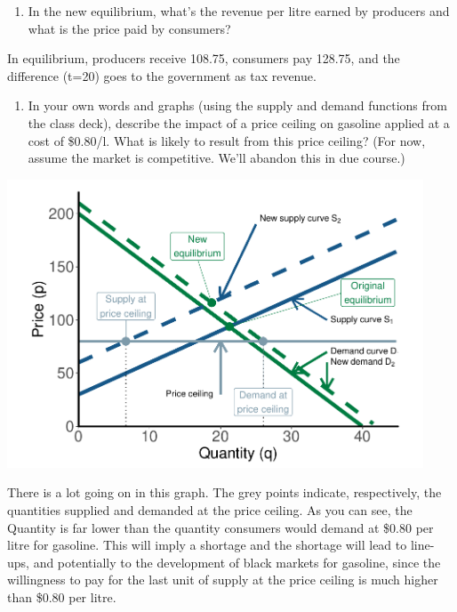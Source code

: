 \documentclass[11pt,]{article}
\providecommand{\tightlist}{%
  \setlength{\itemsep}{0pt}\setlength{\parskip}{0pt}}
\begin{document}
\begin{enumerate}
\def\labelenumi{\alph{enumi})}
\setcounter{enumi}{5}
\tightlist
\item
  In the new equilibrium, what's the revenue per litre earned by
  producers and what is the price paid by consumers?
\end{enumerate}

In equilibrium, producers receive 108.75, consumers pay 128.75, and the
difference (t=20) goes to the government as tax revenue. \newpage

\begin{enumerate}
\def\labelenumi{\arabic{enumi}.}
\setcounter{enumi}{3}
\tightlist
\item
  In your own words and graphs (using the supply and demand functions
  from the class deck), describe the impact of a price ceiling on
  gasoline applied at a cost of \$0.80/l. What is likely to result from
  this price ceiling? (For now, assume the market is competitive. We'll
  abandon this in due course.)
\end{enumerate}

\begin{center}\includegraphics[width=468px]{week_3_problems_soln_files/figure-latex/q_4_graphs-1} \end{center}

There is a lot going on in this graph. The grey points indicate,
respectively, the quantities supplied and demanded at the price ceiling.
As you can see, the Quantity is far lower than the quantity consumers
would demand at \$0.80 per litre for gasoline. This will imply a
shortage and the shortage will lead to line-ups, and potentially to the
development of black markets for gasoline, since the willingness to pay
for the last unit of supply at the price ceiling is much higher than
\$0.80 per litre.
\end{document}

